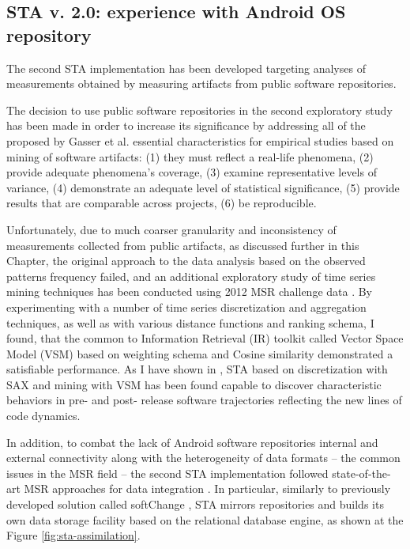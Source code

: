 \subsection{STA v. 2.0: experience with Android OS repository}
The second STA implementation has been developed targeting analyses of measurements obtained by measuring artifacts 
from public software repositories.

The decision to use public software repositories in the second exploratory study has been made in order to increase its 
significance by addressing all of the proposed by Gasser et al. \cite{citeulike:13058334} essential characteristics for 
empirical studies based on mining of software artifacts:  
(1) they must reflect a real-life phenomena, 
(2) provide adequate phenomena's coverage, 
(3) examine representative levels of variance, 
(4) demonstrate an adequate level of statistical significance,
(5) provide results that are comparable across projects,
(6) be reproducible. 

Unfortunately, due to much coarser granularity and inconsistency of measurements collected from public artifacts, 
as discussed further in this Chapter, the original approach to the data analysis based on the observed patterns frequency 
failed, and an additional exploratory study of time series mining techniques has been conducted using 2012 MSR challenge data
\cite{MSRChallenge2012}.
By experimenting with a number of time series discretization and aggregation techniques, as well as with various
distance functions and ranking schema, I found, that the common to Information Retrieval (IR) toolkit called 
Vector Space Model (VSM) based on \tfidf weighting schema and Cosine similarity demonstrated a satisfiable performance. 
As I have shown in \cite{csdl2-11-10}, STA based on discretization with SAX and mining with VSM has been found capable to 
discover characteristic behaviors in pre- and post- release software trajectories reflecting the new lines of code dynamics.

In addition, to combat the lack of Android software repositories internal and external connectivity along with the heterogeneity 
of data formats -- the common issues in the MSR field -- the second STA implementation followed state-of-the-art MSR 
approaches for data integration \cite{citeulike:13058334} \cite{cvsanaly}. 
In particular, similarly to previously developed solution called softChange \cite{german04_softchange}, STA mirrors repositories
and builds its own data storage facility based on the relational database engine, as shown at the Figure \ref{fig:sta-assimilation}.

